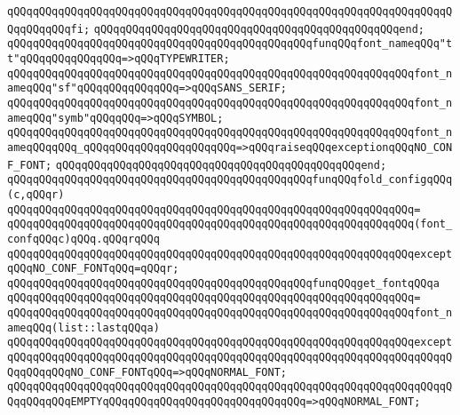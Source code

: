 \verb|qQQqqQQqqQQqqQQqqQQqqQQqqQQqqQQqqQQqqQQqqQQqqQQqqQQqqQQqqQQqqQQqqQQqqQQqqQQqqQQqfi;|\newline
\verb|qQQqqQQqqQQqqQQqqQQqqQQqqQQqqQQqqQQqqQQqqQQqqQQqend;|\newline
\newline
\verb|qQQqqQQqqQQqqQQqqQQqqQQqqQQqqQQqqQQqqQQqqQQqqQQqfunqQQqfont_nameqQQq"tt"qQQqqQQqqQQqqQQq=>qQQqTYPEWRITER;|\newline
\verb|qQQqqQQqqQQqqQQqqQQqqQQqqQQqqQQqqQQqqQQqqQQqqQQqqQQqqQQqqQQqqQQqfont_nameqQQq"sf"qQQqqQQqqQQqqQQq=>qQQqSANS_SERIF;|\newline
\verb|qQQqqQQqqQQqqQQqqQQqqQQqqQQqqQQqqQQqqQQqqQQqqQQqqQQqqQQqqQQqqQQqfont_nameqQQq"symb"qQQqqQQq=>qQQqSYMBOL;|\newline
\verb|qQQqqQQqqQQqqQQqqQQqqQQqqQQqqQQqqQQqqQQqqQQqqQQqqQQqqQQqqQQqqQQqfont_nameqQQqqQQq_qQQqqQQqqQQqqQQqqQQqqQQq=>qQQqraiseqQQqexceptionqQQqNO_CONF_FONT;|\newline
\verb|qQQqqQQqqQQqqQQqqQQqqQQqqQQqqQQqqQQqqQQqqQQqqQQqend;|\newline
\newline
\verb|qQQqqQQqqQQqqQQqqQQqqQQqqQQqqQQqqQQqqQQqqQQqqQQqfunqQQqfold_configqQQq(c,qQQqr)|\newline
\verb|qQQqqQQqqQQqqQQqqQQqqQQqqQQqqQQqqQQqqQQqqQQqqQQqqQQqqQQqqQQqqQQq=|\newline
\verb|qQQqqQQqqQQqqQQqqQQqqQQqqQQqqQQqqQQqqQQqqQQqqQQqqQQqqQQqqQQqqQQq(font_confqQQqc)qQQq.qQQqrqQQq|\newline
\verb|qQQqqQQqqQQqqQQqqQQqqQQqqQQqqQQqqQQqqQQqqQQqqQQqqQQqqQQqqQQqqQQqexceptqQQqNO_CONF_FONTqQQq=qQQqr;|\newline
\newline
\verb|qQQqqQQqqQQqqQQqqQQqqQQqqQQqqQQqqQQqqQQqqQQqqQQqfunqQQqget_fontqQQqa|\newline
\verb|qQQqqQQqqQQqqQQqqQQqqQQqqQQqqQQqqQQqqQQqqQQqqQQqqQQqqQQqqQQqqQQq=|\newline
\verb|qQQqqQQqqQQqqQQqqQQqqQQqqQQqqQQqqQQqqQQqqQQqqQQqqQQqqQQqqQQqqQQqfont_nameqQQq(list::lastqQQqa)|\newline
\verb|qQQqqQQqqQQqqQQqqQQqqQQqqQQqqQQqqQQqqQQqqQQqqQQqqQQqqQQqqQQqqQQqexcept|\newline
\verb|qQQqqQQqqQQqqQQqqQQqqQQqqQQqqQQqqQQqqQQqqQQqqQQqqQQqqQQqqQQqqQQqqQQqqQQqqQQqqQQqNO_CONF_FONTqQQq=>qQQqNORMAL_FONT;|\newline
\verb|qQQqqQQqqQQqqQQqqQQqqQQqqQQqqQQqqQQqqQQqqQQqqQQqqQQqqQQqqQQqqQQqqQQqqQQqqQQqqQQqEMPTYqQQqqQQqqQQqqQQqqQQqqQQqqQQqqQQq=>qQQqNORMAL_FONT;|\newline
